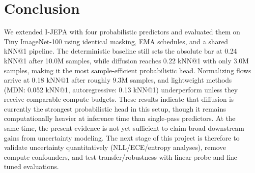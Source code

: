 \documentclass[conference]{IEEEtran}
\begin{document}
\section{Conclusion}
We extended I-JEPA with four probabilistic predictors and evaluated them on Tiny ImageNet-100 using identical masking, EMA schedules, and a shared kNN@1 pipeline.
The deterministic baseline still sets the absolute bar at 0.24 kNN@1 after 10.0M samples, while diffusion reaches 0.22 kNN@1 with only 3.0M samples, making it the most sample-efficient probabilistic head.
Normalizing flows arrive at 0.18 kNN@1 after roughly 9.3M samples, and lightweight methods (MDN: 0.052 kNN@1, autoregressive: 0.13 kNN@1) underperform unless they receive comparable compute budgets.
These results indicate that diffusion is currently the strongest probabilistic head in this setup, though it remains computationally heavier at inference time than single-pass predictors.
At the same time, the present evidence is not yet sufficient to claim broad downstream gains from uncertainty modeling.
The next stage of this project is therefore to validate uncertainty quantitatively (NLL/ECE/entropy analyses), remove compute confounders, and test transfer/robustness with linear-probe and fine-tuned evaluations.



\end{document}
